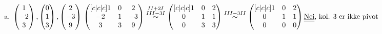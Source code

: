 \documentclass{article}
\newcommand{\vect}[1]{\begin{pmatrix} #1 \end{pmatrix}}
\newcommand{\uu}[1]{\underline{\underline{#1}}}
\newcommand{\eqqto}[1]{\overset{\substack{#1}}{\sim}}
\begin{document}
\begin{enumerate}[a)]
\vspace{2em}

\item \(
\vect{1\\-2\\3}, \vect{0\\1\\3}, \vect{2\\-3\\9}
\\\\\\
\begin{pmatrix}[c|c|c]
1&0&2\\
-2&1&-3\\
3&3&9
\end{pmatrix}
\eqqto{II+2I\\III-3I}
\begin{pmatrix}[c|c|c]
1&0&2\\
0&1&1\\
0&3&3
\end{pmatrix}
\eqqto{III-3II}
\begin{pmatrix}[c|c|c]
1&0&2\\
0&1&1\\
0&0&0
\end{pmatrix}
\\\\\\
\text{\uu{Nei}, kol. 3 er ikke pivot}
\)

\vspace{2em}


\end{enumerate}
\end{document}
